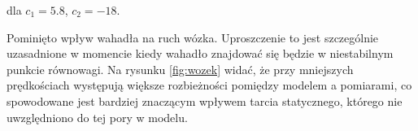 dla $c_1 = 5.8$, $c_2 = -18$. 

Pominięto wpływ wahadła na ruch wózka. Uproszczenie to jest szczególnie uzasadnione w momencie kiedy wahadło znajdować się będzie w niestabilnym punkcie równowagi. Na rysunku \ref{fig:wozek} widać, że przy mniejszych prędkościach występują większe rozbieżności pomiędzy modelem a pomiarami, co spowodowane jest bardziej znaczącym wpływem tarcia statycznego, którego nie uwzględniono do tej pory w modelu.
